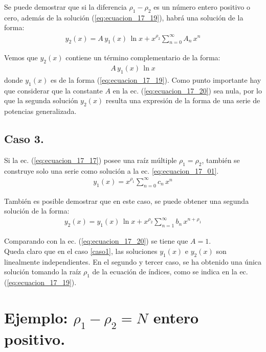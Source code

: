 Se puede demostrar que si la diferencia $\rho_{1} - \rho_{2}$ es un número entero positivo o cero, además de la solución (\ref{eq:ecuacion_17_19}), habrá una solución de la forma:
\begin{align}
y_{2}(x) = A \, y_{1}(x) \, \ln x + x^{\rho_{2}} \sum_{n=0}^{\infty} A_{n} \, x^{n}
\label{eq:ecuacion_17_20}
\end{align}

Vemos que $y_{2}(x)$ contiene un término complementario de la forma:
\begin{align*}
A \, y_{1} (x) \, \ln x
\end{align*}
\noindent
donde $y_{1}(x)$ es de la forma (\ref{eq:ecuacion_17_19}). Como punto importante hay que considerar que la constante $A$ en la ec. (\ref{eq:ecuacion_17_20}) sea nula, por lo que la segunda solución $y_{2}(x)$ resulta una expresión de la forma de una serie de potencias generalizada.


\subsection{Caso 3.}

Si la ec. (\ref{eq:ecuacion_17_17}) posee una raíz múltiple $\rho_{1} = \rho_{2}$, también se construye solo una serie como solución a la ec. \ref{eq:ecuacion_17_01}.
\begin{align*}
y_{1}(x) = x^{\rho_{1}} \sum_{n=0}^{\infty} c_{n} \, x^{n}
\end{align*}

También es posible demostrar que en este caso, se puede obtener una segunda solución de la forma:
\begin{align}
y_{2}(x) = y_{1}(x) \, \ln x + x^{\rho_{2}} \sum_{n=1}^{\infty} b_{n} \, x^{n+\rho_{1}}
\label{eq:ecuacion_22_Zill}
\end{align}

Comparando con la ec. (\ref{eq:ecuacion_17_20}) se tiene que $A = 1$.
\\[0.5em]
\noindent
Queda claro que en el caso \ref{caso1}, las soluciones $y_{1}(x)$ e $y_{2}(x)$ son linealmente independientes. En el segundo y tercer caso, se ha obtenido una única solución tomando la raíz $\rho_{1}$ de la ecuación de índices, como se indica en la ec. (\ref{eq:ecuacion_17_19}).
\par

\section{Ejemplo: \texorpdfstring{$\rho_{1} - \rho_{2} = N$}{r1-r2=N} entero positivo.}\label{ejercicio}

